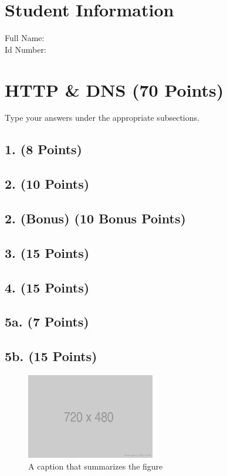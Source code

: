 \documentclass[12pt,a4paper]{article}
\begin{document}
\section*{Student Information} 
Full Name: \\
Id Number: 

\section*{HTTP \& DNS (70 Points)}

Type your answers under the appropriate subsections.

\subsection*{1. (8 Points)}

\subsection*{2. (10 Points)}

\subsection*{2. (Bonus) (10 Bonus Points)}

\subsection*{3. (15 Points)}

\subsection*{4. (15 Points)}

\subsection*{5a. (7 Points)}

\subsection*{5b. (15 Points)}

\begin{figure}[htbp] %
    \centerline{\includegraphics[width=0.5\textwidth]{720x480.png}} 
    \caption{A caption that summarizes the figure}%
    \label{fig:example_figure} %
\end{figure}
\end{document}
